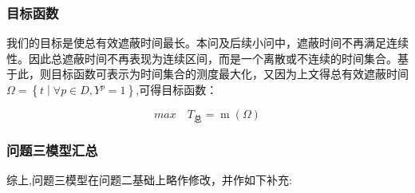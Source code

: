 \documentclass[withoutpreface,bwprint]{cumcmthesis}
\numberwithin{equation}{section} %
\numberwithin{figure}{section} %
\numberwithin{table}{section}  %
\begin{document}
\subsubsection{目标函数}

我们的目标是使总有效遮蔽时间最长。本问及后续小问中，遮蔽时间不再满足连续性。因此总遮蔽时间不再表现为连续区间，而是一个离散或不连续的时间集合。基于此，则目标函数可表示为时间集合的测度最大化，又因为上文得总有效遮蔽时间$\Omega =\left\{ t\middle| \forall p\in D,Y^{p}=1 \right\}$,可得目标函数：

\begin{equation}
     \textit{max} \quad T_{\text{总}} = \operatorname{m}(\Omega)
\end{equation}


\vspace{-0.5em}
\subsubsection{问题三模型汇总}

综上,问题三模型在问题二基础上略作修改，并作如下补充:
\end{document}
